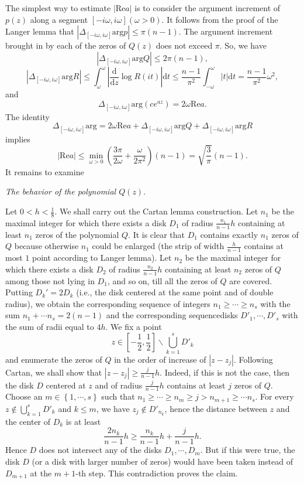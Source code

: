 The simplest way to estimate $\left| \mathrm{Re}a \right| $ is to consider the argument increment of $p(z)$ along a segment $\left[ -i\omega,i\omega \right] (\omega>0)$. It follows from the proof of the Langer lemma that $\left| \Delta_{\left[ -i\omega,i\omega \right] }\mathrm{arg} p \right| \le \pi(n-1)$. The argument increment brought in by each of the zeros of $Q(z)$ does not exceed $\pi$. So, we have 
\[
  \left| \Delta_{\left[ -i\omega,i\omega \right]}\mathrm{arg}Q \right| \le 2\pi(n-1),
\] 
\[
  \left| \Delta_{\left[ -i\omega,i\omega \right] }\mathrm{arg}R \right| \le \int_{\omega}^{\omega}\left|  \frac{\mathrm{d}}{\mathrm{d}z}\log R(it) \right| \mathrm{d}t\le  \frac{n-1}{\pi^2}\int_{-\omega}^{\omega}\left| t \right| \mathrm{d}t= \frac{n-1}{\pi^2}\omega^2,
\] 
and
\[
  \Delta_{\left[ -i\omega,i\omega \right]} \mathrm{arg}(ce^{az})=2\omega \mathrm{Re}a.
\] 
The identity 
\[
  \Delta_{\left[ -i\omega,i\omega \right]} \mathrm{arg}=2\omega \mathrm{Re}a+\Delta_{\left[ -i\omega,i\omega \right]} \mathrm{arg}Q+\Delta_{\left[ -i\omega,i\omega \right]}\mathrm{arg}R
\] 
implies
\[
  \left| \mathrm{Re}a \right| \le \min_{\omega>0}\left( \frac{3\pi}{2\omega}+\frac{\omega}{2\pi^2} \right) (n-1)=\sqrt{\frac{3}{\pi}} (n-1).
\] 
It remains to examine

\textit{The behavior of the polynomial $Q(z)$}. 

Let $0<h<\frac{1}{8}$. We shall carry out the Cartan lemma construction. Let $n_1$ be the maximal integer for which there exists a disk $D_1$ of radius $ \frac{n_1}{n-1}h$ containing at least $n_1$ zeros of the polynomial $Q$. It is clear that $D_1$ contains exactly $n_1$ zeros of $Q$ because otherwise $n_1$ could be enlarged (the strip of width $\frac{h}{n-1}$ contains at most $1$ point according to Langer lemma).
Let $n_2$ be the maximal integer for which there exists a disk $D_2$ of radius $\frac{n_2}{n-1}h$ containing at least $n_2$ zeros of $Q$ among those not lying in $D_1$, and so on, till all the zeros of $Q$ are covered. Putting $D_k'=2D_k$ (i.e., the disk centered at the same point and of double radius), we obtain the corresponding sequence of integers $n_1\ge \cdots\ge n_s$ with the sum $n_1+\cdots n_s=2(n-1)$ and the corresponding sequencedisks $D'_1,\cdots,D'_s$ with the sum of radii equal to $4h$. We fix a point 
\[
z\in \left[ -\frac{1}{2},\frac{1}{2} \right] \backslash \bigcup_{k=1} ^{s}D'_k
\] and enumerate the zeros of $Q$ in the order of increase of $\left| z-z_j \right| $. Following Cartan, we shall show that $\left| z-z_j \right| \ge \frac{j}{n-1}h$. 
Indeed, if this is not the case, then the disk $D$ centered at $z$ and of radius $\frac{j}{n-1}h$ contains at least $j$ zeros of $Q$. Choose an $m\in \left\{ 1,\cdots,s \right\} $ such that $n_1\ge \cdots \ge n_m\ge j>n_{m+1}\ge \cdots n_s$. For every $z\not\in  \bigcup_{k=1} ^{s}D'_k$ and $k\le m$, we have  $z_j\not\in D'_{n_k}$, hence the distance between $z$ and the center of $D_k$ is at least
\[
  \frac{2n_k}{n-1}h\ge  \frac{n_k}{n-1}h+\frac{j}{n-1}h.
\]
Hence $D$ does not intersect any of the disks $D_1,\cdots,D_m$. But if this were true, the disk $D$ (or a disk with larger number of zeros) would have been taken instead of $D_{m+1}$ at the $m+1$-th step. This contradiction proves the claim.

